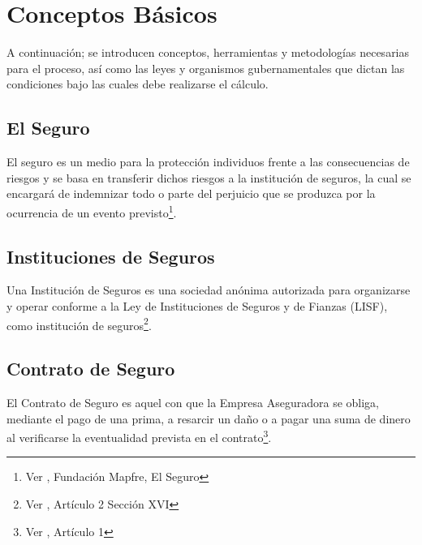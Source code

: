 \documentclass[11pt,twoside,openright,spanish]{report}
\numberwithin{equation}{chapter}
\numberwithin{figure}{chapter}
\numberwithin{table}{chapter}
\renewcommand{\footrulewidth}{0pt}
\renewcommand{\headrulewidth}{0.1pt}
\begin{document}
	\fancypagestyle{plain}{
		\fancyhead[L]{}
		\fancyhead[C]{}
		\fancyhead[R]{}
		
		\fancyfoot[L]{}
		\fancyfoot[C]{\thepage}
		\fancyfoot[R]{}
		\renewcommand{\headrulewidth}{0pt}
		\renewcommand{\footrulewidth}{0pt}
	}
	
	\fancyhead[LE]{\scshape\thepage\hspace{1cm}\footnotesize\nouppercase{\leftmark}}
	\fancyhead[LO]{}
	\fancyhead[RE]{}
	\pagestyle{fancy}
	\cleardoublepage


	\chapter{Conceptos Básicos}

A continuación; se introducen conceptos, herramientas y metodologías necesarias para el proceso, así como las leyes y organismos gubernamentales que dictan las condiciones bajo las cuales debe realizarse el cálculo.

	\section{El Seguro}
	El seguro es un medio para la protección individuos frente a las consecuencias de riesgos y se basa en transferir dichos riesgos a la institución de seguros, la cual se encargará de indemnizar todo o parte del perjuicio que se produzca por la ocurrencia de un evento previsto\footnote{Ver \citet{ASeguro}, Fundación Mapfre, El Seguro}.
	
	\section{Instituciones de Seguros}

	Una Institución de Seguros es una sociedad anónima autorizada para organizarse y operar conforme a la Ley de Instituciones de Seguros y de Fianzas (LISF), como institución de seguros\footnote{Ver \citet{BAseguradora}, Artículo 2 Sección XVI}.

 
	
	\section{Contrato de Seguro}
	
	El Contrato de Seguro es aquel con que la Empresa Aseguradora se obliga, mediante el pago de una prima, a resarcir un daño o a pagar una suma de dinero al verificarse la eventualidad prevista en el contrato\footnote{Ver \citet{CContrato}, Artículo 1}.
	
\end{document}
